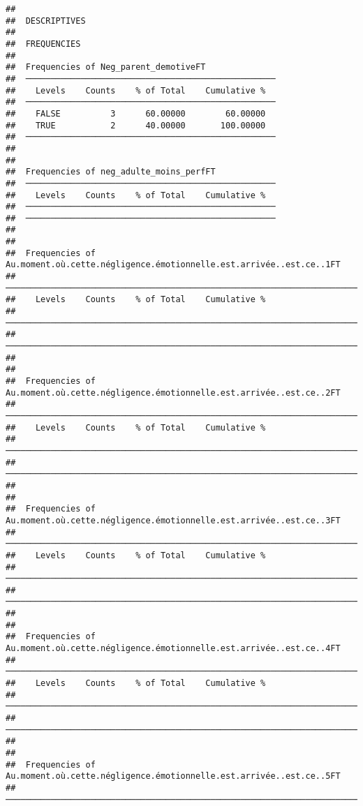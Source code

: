\documentclass[
]{article}
\begin{document}
\begin{verbatim}
## 
##  DESCRIPTIVES
## 
##  FREQUENCIES
## 
##  Frequencies of Neg_parent_demotiveFT               
##  ────────────────────────────────────────────────── 
##    Levels    Counts    % of Total    Cumulative %   
##  ────────────────────────────────────────────────── 
##    FALSE          3      60.00000        60.00000   
##    TRUE           2      40.00000       100.00000   
##  ────────────────────────────────────────────────── 
## 
## 
##  Frequencies of neg_adulte_moins_perfFT             
##  ────────────────────────────────────────────────── 
##    Levels    Counts    % of Total    Cumulative %   
##  ────────────────────────────────────────────────── 
##  ────────────────────────────────────────────────── 
## 
## 
##  Frequencies of Au.moment.où.cette.négligence.émotionnelle.est.arrivée..est.ce..1FT 
##  ────────────────────────────────────────────────────────────────────────────────── 
##    Levels    Counts    % of Total    Cumulative %   
##  ────────────────────────────────────────────────────────────────────────────────── 
##  ────────────────────────────────────────────────────────────────────────────────── 
## 
## 
##  Frequencies of Au.moment.où.cette.négligence.émotionnelle.est.arrivée..est.ce..2FT 
##  ────────────────────────────────────────────────────────────────────────────────── 
##    Levels    Counts    % of Total    Cumulative %   
##  ────────────────────────────────────────────────────────────────────────────────── 
##  ────────────────────────────────────────────────────────────────────────────────── 
## 
## 
##  Frequencies of Au.moment.où.cette.négligence.émotionnelle.est.arrivée..est.ce..3FT 
##  ────────────────────────────────────────────────────────────────────────────────── 
##    Levels    Counts    % of Total    Cumulative %   
##  ────────────────────────────────────────────────────────────────────────────────── 
##  ────────────────────────────────────────────────────────────────────────────────── 
## 
## 
##  Frequencies of Au.moment.où.cette.négligence.émotionnelle.est.arrivée..est.ce..4FT 
##  ────────────────────────────────────────────────────────────────────────────────── 
##    Levels    Counts    % of Total    Cumulative %   
##  ────────────────────────────────────────────────────────────────────────────────── 
##  ────────────────────────────────────────────────────────────────────────────────── 
## 
## 
##  Frequencies of Au.moment.où.cette.négligence.émotionnelle.est.arrivée..est.ce..5FT 
##  ────────────────────────────────────────────────────────────────────────────────── 

\end{verbatim}
\end{document}
